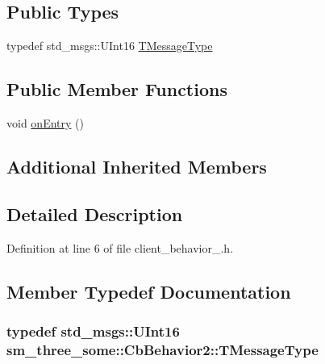 \subsection*{Public Types}
\begin{DoxyCompactItemize}
\item 
typedef std\+\_\+msgs\+::\+U\+Int16 \hyperlink{classsm__three__some_1_1CbBehavior2_ae22660f6e39331e2e12bea45d5cc1bce}{T\+Message\+Type}
\end{DoxyCompactItemize}
\subsection*{Public Member Functions}
\begin{DoxyCompactItemize}
\item 
void \hyperlink{classsm__three__some_1_1CbBehavior2_afe7a4515a9bca7459a2544bd4ec1db44}{on\+Entry} ()
\end{DoxyCompactItemize}
\subsection*{Additional Inherited Members}


\subsection{Detailed Description}


Definition at line 6 of file client\+\_\+behavior\+\_.\+h.



\subsection{Member Typedef Documentation}
\subsubsection[{\texorpdfstring{T\+Message\+Type}{TMessageType}}]{\setlength{\rightskip}{0pt plus 5cm}typedef std\+\_\+msgs\+::\+U\+Int16 {\bf sm\+\_\+three\+\_\+some\+::\+Cb\+Behavior2\+::\+T\+Message\+Type}}\hypertarget{classsm__three__some_1_1CbBehavior2_ae22660f6e39331e2e12bea45d5cc1bce}{}\label{classsm__three__some_1_1CbBehavior2_ae22660f6e39331e2e12bea45d5cc1bce}


